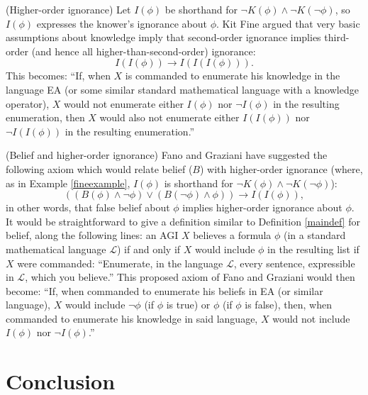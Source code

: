 \documentclass[runningheads]{llncs}
\begin{document}
\begin{example}
\label{fineexample}
  (Higher-order ignorance) Let $I(\phi)$ be shorthand for
  $\neg K(\phi)\wedge \neg K(\neg\phi)$, so $I(\phi)$ expresses the knower's
  ignorance about $\phi$. Kit Fine argued \cite{fine2018ignorance} that very
  basic assumptions
  about knowledge imply that second-order ignorance implies third-order (and hence
  all higher-than-second-order) ignorance:
  \[
    I(I(\phi)) \rightarrow I(I(I(\phi))).
  \]
  This becomes: ``If, when $X$ is commanded to enumerate his knowledge in the
  language EA (or some similar standard mathematical language with a knowledge
  operator), $X$ would not enumerate either $I(\phi)$ nor $\neg I(\phi)$ in
  the resulting enumeration, then $X$ would also not enumerate either $I(I(\phi))$
  nor $\neg I(I(\phi))$ in the resulting enumeration.''
\end{example}

\begin{example}
  (Belief and higher-order ignorance) Fano and Graziani have suggested \cite{fano} the
  following axiom which would relate belief ($B$) with higher-order ignorance
  (where, as in Example \ref{fineexample}, $I(\phi)$ is shorthand for
  $\neg K(\phi)\wedge \neg K(\neg\phi)$):
  \[
    ((B(\phi) \wedge \neg\phi)\vee (B(\neg\phi)\wedge \phi)) \rightarrow I(I(\phi)),
  \]
  in other words, that false belief about $\phi$ implies higher-order ignorance
  about $\phi$. It would be straightforward to give a definition similar to
  Definition \ref{maindef} for belief, along the following lines: an AGI $X$
  believes a formula $\phi$ (in a standard mathematical language $\mathscr L$)
  if and only if $X$ would include $\phi$ in the resulting list if $X$ were
  commanded:
    ``Enumerate, in the language $\mathscr L$, every sentence,
  expressible in $\mathscr L$, which you believe.''
  This proposed axiom of Fano and Graziani would then become:
  ``If, when commanded to enumerate his beliefs in EA (or similar language),
  $X$ would include $\neg\phi$ (if $\phi$ is true) or $\phi$ (if $\phi$ is false),
  then, when commanded to enumerate his knowledge in said language,
  $X$ would not include $I(\phi)$ nor $\neg I(\phi)$.''
\end{example}

\section{Conclusion}
\label{conclusionsection}
\end{document}
